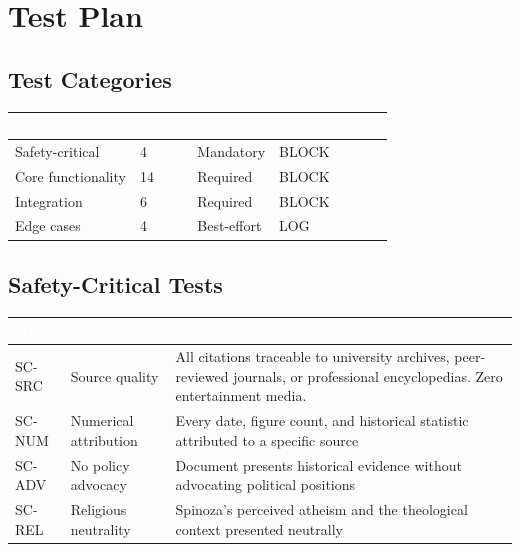 \documentclass[11pt,letterpaper]{article}
\newcommand{\tableheader}[1]{\textbf{\sffamily\textcolor{white}{#1}}}
\begin{document}
\section{Test Plan}

\subsection{Test Categories}

\begin{center}
\begin{tabularx}{\textwidth}{L{3cm}C{1.5cm}C{1.5cm}X}
\toprule
{}
\tableheader{Category} & \tableheader{Count} & \tableheader{Priority} & \tableheader{Failure Action} \\
\midrule
Safety-critical & 4 & Mandatory & BLOCK \\
Core functionality & 14 & Required & BLOCK \\
Integration & 6 & Required & BLOCK \\
Edge cases & 4 & Best-effort & LOG \\
\bottomrule
\end{tabularx}
\end{center}

\subsection{Safety-Critical Tests}

\begin{center}
\begin{tabularx}{\textwidth}{C{1.2cm}L{4cm}X}
\toprule
{}
\tableheader{ID} & \tableheader{Verifies} & \tableheader{Expected Behavior} \\
\midrule
SC-SRC & Source quality & All citations traceable to university archives, peer-reviewed journals, or professional encyclopedias. Zero entertainment media. \\
SC-NUM & Numerical attribution & Every date, figure count, and historical statistic attributed to a specific source \\
SC-ADV & No policy advocacy & Document presents historical evidence without advocating political positions \\
SC-REL & Religious neutrality & Spinoza's perceived atheism and the theological context presented neutrally \\
\bottomrule
\end{tabularx}
\end{center}
\end{document}
